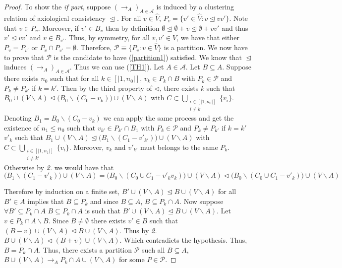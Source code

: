 \documentclass[11pt]{article}
\begin{document}
\begin{proof}
To show the \textit{if part}, suppose $(\rightarrow_A)_{A\in\mathcal{A}}$ is induced by a clustering relation of axiological consistency $\trianglelefteq$. For all $v\in \hat{V}$,  $P_v= \{v'\in \hat{V}: v\trianglelefteq vv'\}$. Note that $v\in P_v$. Moreover, if $v'\in B_v$ then by definition $\emptyset \trianglelefteq \emptyset +v \trianglelefteq \emptyset +vv'$ and thus $v' \trianglelefteq vv'$ and $v\in B_{v'}$. Thus, by symmetry, for all $v,v'\in \hat{V}$, we have that either $P_v= P_{v'}$ or $P_v\cap  P_{v'}= \emptyset$. Therefore, $\mathcal{P}\equiv\{P_v: v\in \hat{V}\}$ is a partition. We now have to prove that $\mathcal{P}$ is the candidate to have (\ref{partition1}) satisfied. We know that $\trianglelefteq$ induces $(\rightarrow_A)_{A\in\mathcal{A}}$. Thus we can use (\ref{TH1}). Let $A\in \mathcal{A}$. Let $B\subseteq A$. Suppose there exists $n_0$ such that for all $k\in [|1,n_0|]$, $v_k\in P_k\cap B$ with $P_k \in \mathcal{P}$ and $P_k\not= P_{k'}$ if $k=k'$. Then by the third property of $\triangleleft$, there exists $k$ such that $B_0\cup(V\backslash A)\trianglelefteq \big(B_0\backslash (C_0-v_k)\big)\cup(V\backslash A)$ with $C\subset \displaystyle \bigcup_{\substack{i\in [|1,n_0|] \\ i\not= k}} \{v_i\}$. Denoting $B_1=B_0\backslash (C_0-v_k)$ we can apply the same process and get the existence of $n_1\leq n_0$ such that $v_{k'}\in P_{k'}\cap B_1$ with $P_k \in \mathcal{P}$ and $P_k\not= P_{k'}$ if $k=k'$ $v'_k$ such that $B_1\cup(V\backslash A)\trianglelefteq \big(B_1\backslash (C_1-v'_{k'})\big)\cup(V\backslash A)$ with $C\subset \displaystyle \bigcup_{\substack{i\in [|1,n_1|] \\ i\not= k'}} \{v_i\}$. Moreover, $v_k$ and $v'_{k'}$ must belongs to the same $P_k$. Otherwise by \textit{2.} we would have that 
$$\big(B_1\backslash (C_1-v'_k)\big)\cup(V\backslash A)=\big(B_0\backslash (C_0\cup C_1 -v'_kv_k)\big)\cup(V\backslash A)\triangleleft \big(B_0\backslash (C_0\cup C_1 -v'_k)\big)\cup(V\backslash A)$$
 
 Therefore by induction on a finite set, $B' \cup (V\backslash A) \trianglelefteq B\cup (V\backslash A)$ for all $B'\in A$ implies that $B\subseteq P_k$ and since $B\subseteq A$, $B\subseteq P_k\cap A$. Now  suppose $\forall B'\subseteq P_k\cap A$  $B\subseteq P_k\cap A$ is such that $B' \cup (V\backslash A) \trianglelefteq B\cup (V\backslash A)$. Let $v\in P_k\cap A \backslash B$. Since $B\not= \emptyset$ there exists $v'\in B$ such that $(B-v)\cup (V\backslash A)\trianglelefteq B\cup (V\backslash A)$. Thus by \textit{2.} $B\cup (V\backslash A)\triangleleft (B+v)\cup (V\backslash A)$. Which contradicts the hypothesis. Thus, $B=P_k\cap A.$ Thus, there exists a partition $\mathcal{P}$ such all $B\subseteq A$, $B\cup (V\backslash A)\rightarrow_A P_k\cap A\cup (V\backslash A)$ for some $P\in \mathcal{P}$.
 

\end{proof}
\end{document}
